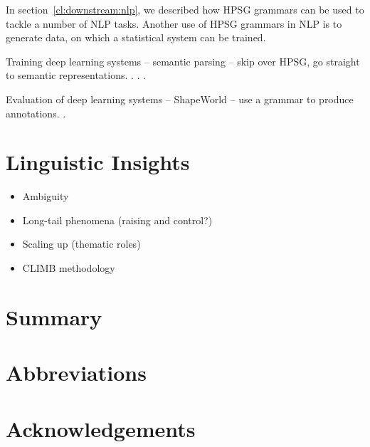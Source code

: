 \documentclass[output=paper,nonflat]{langsci/langscibook}
\begin{document}
In section~\ref{cl:downstream:nlp},
we described how HPSG grammars can be used to tackle a number of NLP tasks.
Another use of HPSG grammars in NLP
is to generate data, on which a statistical system can be trained.

Training deep learning systems
-- semantic parsing
-- skip over HPSG, go straight to semantic representations.
\citep{oepen2014semeval,oepen2015semeval}.
\citet{buys2017parse}.
\citet{chen2018parse}.

Evaluation of deep learning systems
-- ShapeWorld
-- use a grammar to produce annotations.
\citet{kuhnle2018shapeworld}.





\section{Linguistic Insights}
\label{cl:insight}

\begin{itemize}
    \item Ambiguity %
    \item Long-tail phenomena (raising and control?) %
    \item Scaling up (thematic roles) %
    \item CLIMB methodology %
\end{itemize}

\section{Summary}

\section*{Abbreviations}
\section*{Acknowledgements}

\printbibliography[heading=subbibliography,notkeyword=this] 
\end{document}
